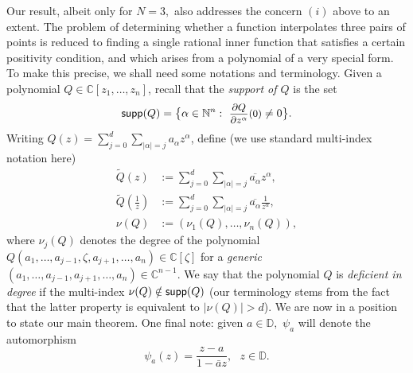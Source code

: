 \documentclass[11pt, reqno]{amsart}
\numberwithin{equation}{section}
\theoremstyle{definition}
\theoremstyle{remark}
\theoremstyle{plain}
\begin{document}
Our result, albeit only for $N=3,$ also addresses the concern $(i)$ above to an extent. The problem
of determining whether a function interpolates three pairs of points is reduced to finding a single rational inner function
that satisfies a certain positivity condition, and which arises from a polynomial of a very special form.
To make this precise, we shall need some notations and terminology. Given a polynomial
$Q\in {\mathbb{C}}[z_1,\dots, z_n]$, recall that the {\em support of $Q$} is the set
\[
 {\sf supp}(Q) = \big\{\alpha\in {\mathbb{N}^n} : \ \text{\small $\dfrac{\partial Q}{\partial z^\alpha}(0)$}\neq 0\big\}.
\]
Writing $Q(z) =\sum_{j=0}^{d}\sum_{|\alpha|=j} a_{\alpha}z^{\alpha}$, define
(we use standard multi-index notation here)
\begin{align*}
 \widetilde{Q}(z)&:=\sum_{j=0}^{d}\sum_{|\alpha|=j}\overline{a_{\alpha}}z^{\alpha},\\
 \widetilde{Q}\left(\frac{1}{z}\right)&:=\sum_{j=0}^{d}\sum_{|\alpha|=j}\overline{a_{\alpha}}
 \frac{1}{z^{\alpha}},\\
 \nu(Q)&:=(\nu_1(Q),\ldots,\nu_n(Q)),
\end{align*}
where $\nu_j(Q)$ denotes the
degree of the polynomial $Q(a_1,\ldots,a_{j-1},\zeta,a_{j+1},\ldots,a_n)\in{\mathbb{C}}[\zeta]$ for a {\em generic}
$(a_1,\ldots,a_{j-1},a_{j+1},\ldots,a_n)\in{\mathbb{C}}^{n-1}.$ We say that the polynomial $Q$ is {\em deficient
in degree} if the multi-index $\nu(Q)\notin {\sf supp}(Q)$ (our terminology stems from the fact that the
latter property is equivalent to $|\nu(Q)| > d$). We are now in a position to state our main theorem.
One final note: given $a\in{\mathbb{D}},$ $\psi_a$ will denote the automorphism
\begin{equation}
\psi_a(z)=\frac{z-a}{1-\bar{a}z}, \ \ \ z\in{\mathbb{D}}.\label{E:aaut}
\end{equation}
\end{document}
